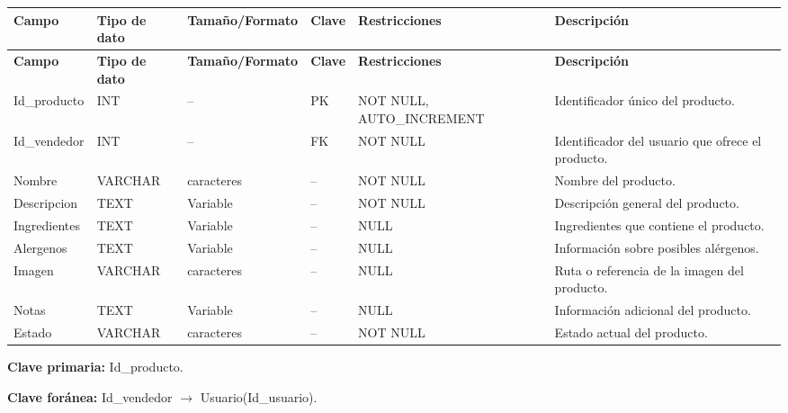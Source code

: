 \documentclass[12pt]{article} %
\begin{document}
\begin{longtable}{>{\raggedright\arraybackslash}p{2.5cm}
                  >{\raggedright\arraybackslash}p{2.0cm}
                  >{\raggedright\arraybackslash}p{2.2cm}
                  >{\raggedright\arraybackslash}p{1.2cm}
                  >{\raggedright\arraybackslash}p{3.0cm}
                  >{\raggedright\arraybackslash}p{4.0cm}}
\toprule
\textbf{Campo} &
\textbf{Tipo de dato} &
\textbf{Tamaño/Formato} &
\textbf{Clave} &
\textbf{Restricciones} &
\textbf{Descripción} \\
\midrule
\endfirsthead

\toprule
\textbf{Campo} &
\textbf{Tipo de dato} &
\textbf{Tamaño/Formato} &
\textbf{Clave} &
\textbf{Restricciones} &
\textbf{Descripción} \\
\midrule
\endhead

Id\_producto &
INT &
-- &
PK &
NOT NULL, AUTO\_INCREMENT &
Identificador único del producto. \\

Id\_vendedor &
INT &
-- &
FK &
NOT NULL &
Identificador del usuario que ofrece el producto. \\

Nombre &
VARCHAR &
100 caracteres &
-- &
NOT NULL &
Nombre del producto. \\

Descripcion &
TEXT &
Variable &
-- &
NOT NULL &
Descripción general del producto. \\

Ingredientes &
TEXT &
Variable &
-- &
NULL &
Ingredientes que contiene el producto. \\

Alergenos &
TEXT &
Variable &
-- &
NULL &
Información sobre posibles alérgenos. \\

Imagen &
VARCHAR &
255 caracteres &
-- &
NULL &
Ruta o referencia de la imagen del producto. \\

Notas &
TEXT &
Variable &
-- &
NULL &
Información adicional del producto. \\

Estado &
VARCHAR &
20 caracteres &
-- &
NOT NULL &
Estado actual del producto. \\

\bottomrule
\end{longtable}

\textbf{Clave primaria:} Id\_producto.

\textbf{Clave foránea:}
Id\_vendedor $\rightarrow$ Usuario(Id\_usuario).
\end{document}
